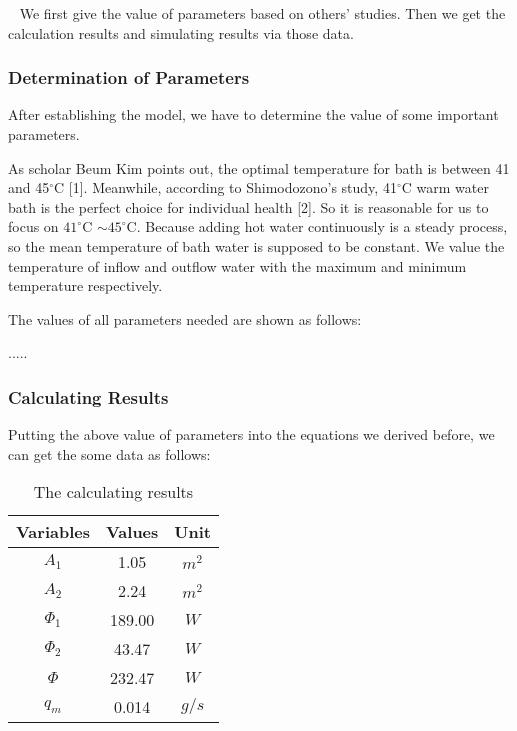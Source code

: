 \quad~ We first give the value of parameters based on others’ studies. Then we get the calculation results and simulating results via those data.

\subsubsection{Determination of Parameters}

After establishing the model, we have to determine the value of some
important parameters.

As scholar Beum Kim points out, the optimal temperature for bath is
between 41 and 45$^\circ$C [1]. Meanwhile, according to Shimodozono's study, 41$^\circ$C warm water bath is the perfect choice for individual health [2]. So it is reasonable for us to focus on $41^\circ$C $\sim 45^\circ$C. Because adding hot water continuously is a steady process, so the mean temperature of bath water is supposed to be constant. We value the temperature of inflow and outflow water with the maximum and minimum temperature respectively.

The values of all parameters needed are shown as follows:

.....

\subsubsection{Calculating Results}

Putting the above value of parameters into the equations we derived before, we can get the some data as follows:

\begin{table}[h]  %
    \centering        %
    \caption{The calculating results}  %
    \vspace{0.15cm}
    \label{tab2}                       %
    \begin{tabular}{|c|c|c|}  %
        \hline                    %
        Variables & Values & Unit  \\ \hline  %
        $A_1$     & 1.05   & $m^2$ \\ \hline
        $A_2$     & 2.24   & $m^2$ \\ \hline
        $\Phi_1$  & 189.00 & $W$   \\ \hline
        $\Phi_2$  & 43.47  & $W$   \\ \hline
        $\Phi$    & 232.47 & $W$   \\ \hline
        $q_m$     & 0.014  & $g/s$ \\ \hline
    \end{tabular}
\end{table}

